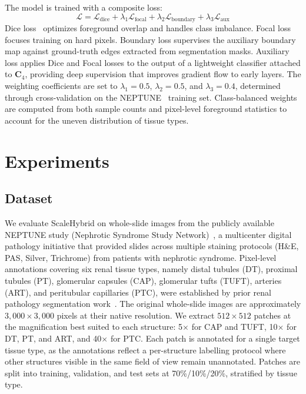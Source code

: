 \documentclass[runningheads]{llncs}
\begin{document}
The model is trained with a composite loss:
\begin{equation}
    \mathcal{L} = \mathcal{L}_\text{dice} + \lambda_1 \mathcal{L}_\text{focal} + \lambda_2 \mathcal{L}_\text{boundary} + \lambda_3 \mathcal{L}_\text{aux}
\end{equation}
Dice loss~\cite{milletari2016vnet} optimizes foreground overlap and handles class imbalance. Focal loss~\cite{lin2017focal} focuses training on hard pixels. Boundary loss supervises the auxiliary boundary map against ground-truth edges extracted from segmentation masks. Auxiliary loss applies Dice and Focal losses to the output of a lightweight classifier attached to $\mathbf{C}_4$, providing deep supervision that improves gradient flow to early layers. The weighting coefficients are set to $\lambda_1 = 0.5$, $\lambda_2 = 0.5$, and $\lambda_3 = 0.4$, determined through cross-validation on the NEPTUNE~\cite{barisoni2013neptune} training set. Class-balanced weights~\cite{cui2019classbalanced} are computed from both sample counts and pixel-level foreground statistics to account for the uneven distribution of tissue types.


\section{Experiments}

\subsection{Dataset}

We evaluate ScaleHybrid on whole-slide images from the publicly available NEPTUNE study (Nephrotic Syndrome Study Network)~\cite{barisoni2013neptune}, a multicenter digital pathology initiative that provided slides across multiple staining protocols (H\&E, PAS, Silver, Trichrome) from patients with nephrotic syndrome. Pixel-level annotations covering six renal tissue types, namely distal tubules (DT), proximal tubules (PT), glomerular capsules (CAP), glomerular tufts (TUFT), arteries (ART), and peritubular capillaries (PTC), were established by prior renal pathology segmentation work~\cite{hats2024,prpseg2024}. The original whole-slide images are approximately $3{,}000 \times 3{,}000$ pixels at their native resolution. We extract $512 \times 512$ patches at the magnification best suited to each structure: 5$\times$ for CAP and TUFT, 10$\times$ for DT, PT, and ART, and 40$\times$ for PTC. Each patch is annotated for a single target tissue type, as the annotations reflect a per-structure labelling protocol where other structures visible in the same field of view remain unannotated. Patches are split into training, validation, and test sets at 70\%/10\%/20\%, stratified by tissue type.
\end{document}
